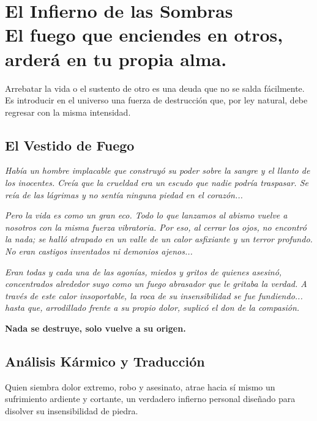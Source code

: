 \chapter[El Infierno de las Sombras]{El Infierno de las Sombras\\ \large El fuego que enciendes en otros, arderá en tu propia alma.}


\lettrine[lines=3, nindent=0.5em, findent=0.2em]{A}{}rrebatar la vida o el sustento de otro es una deuda que no se salda fácilmente. Es introducir en el universo una fuerza de destrucción que, por ley natural, debe regresar con la misma intensidad.

\section{El Vestido de Fuego}
\begin{elegantquote}
\textit{Había un hombre implacable que construyó su poder sobre la sangre y el llanto de los inocentes. Creía que la crueldad era un escudo que nadie podría traspasar. Se reía de las lágrimas y no sentía ninguna piedad en el corazón...}

\textit{Pero la vida es como un gran eco. Todo lo que lanzamos al abismo vuelve a nosotros con la misma fuerza vibratoria. Por eso, al cerrar los ojos, no encontró la nada; se halló atrapado en un valle de un calor asfixiante y un terror profundo. No eran castigos inventados ni demonios ajenos...}

\textit{Eran todas y cada una de las agonías, miedos y gritos de quienes asesinó, concentrados alrededor suyo como un fuego abrasador que le gritaba la verdad. A través de este calor insoportable, la roca de su insensibilidad se fue fundiendo... hasta que, arrodillado frente a su propio dolor, suplicó el don de la compasión.}

\end{elegantquote}

\vspace{1em}
\begin{center}
    \textbf{\Large Nada se destruye, solo vuelve a su origen.}
\end{center}
\vspace{1em}

\section{Análisis Kármico y Traducción}
\begin{figure}
  \vspace{-1.5em}
  \begin{center}
  \end{center}
  \vspace{-1.5em}
\end{figure}
Quien siembra dolor extremo, robo y asesinato, atrae hacia sí mismo un sufrimiento ardiente y cortante, un verdadero infierno personal diseñado para disolver su insensibilidad de piedra.

